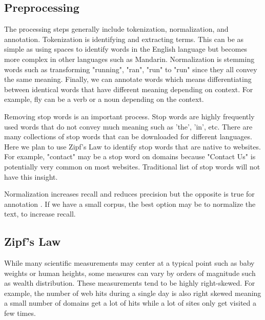 \documentclass[12pt]{article}
\begin{document}
\setcounter{subsection}{0}
\addtocounter{section}{1}

\begin{center}
\subsection{Preprocessing}
\end{center}


The processing steps generally include tokenization, normalization, and annotation. Tokenization is identifying and extracting terms. This can be as simple as using spaces to identify words in the English language but becomes more complex in other languages such as Mandarin. Normalization is stemming words such as transforming "running", "ran", "run" to "run" since they all convey the same meaning. Finally, we can annotate words which means differentiating between identical words that have different meaning depending on context. For example, fly can be a verb or a noun depending on the context. 

Removing stop words is an important process. Stop words are highly frequently used words that do not convey much meaning such as 'the', 'in', etc. There are many collections of stop words that can be downloaded for different languages. Here we plan to use Zipf's Law to identify stop words that are native to websites. For example, "contact" may be a stop word on domains because "Contact Us" is potentially very common on most websites. Traditional list of stop words will not have this insight.

Normalization increases recall and reduces precision but the opposite is true for annotation \cite{Turney:2010:FMV:1861751.1861756}. If we have a small corpus, the best option may be to normalize the text, to increase recall.

\begin{center}
\subsection{Zipf's Law}
\end{center}

While many scientific measurements may center at a typical point such as baby weights or human heights, some measures can vary by orders of magnitude such as wealth distribution. These measurements tend to be highly right-skewed. For example, the number of web hits during a single day is also right skewed meaning a small number of domains get a lot of hits while a lot of sites only get visited a few times. 
\end{document}
